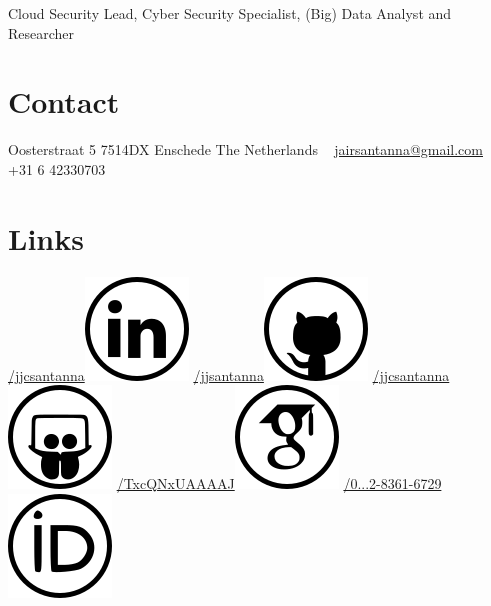 \documentclass[print]{styles/friggeri-cv-mac} %
\begin{document}
{Cloud Security Lead, Cyber Security Specialist, (Big) Data Analyst and Researcher} 
\begin{aside} 
 \section{Contact}
 Oosterstraat 5
 7514DX Enschede
 The Netherlands
~
\href{mailto:jairsantanna@gmail.com}{jairsantanna@gmail.com}
+31 6 42330703
~
\section{Links}\hspace{-1cm}
\hspace{-0.5cm}
\href{https://www.linkedin.com/in/jjcsantanna}{/jjcsantanna}\includegraphics[scale=0.3]{img/linkedin.png}
\href{https://github.com/jjsantanna}{/jjsantanna\includegraphics[scale=0.3]{img/github.png}}
\href{http://www.slideshare.net/jjcsantanna}{/jjcsantanna}\includegraphics[scale=0.3]{img/slideshare.png}
\href{https://scholar.google.com/citations?user=TxcQNxUAAAAJ}{/TxcQNxUAAAAJ}\includegraphics[scale=0.3]{img/googlescholar.png}
\href{http://orcid.org/0000-0002-8361-6729}{/0...2-8361-6729}\includegraphics[scale=0.3]{img/orcid.png}

\end{aside}
\end{document}
